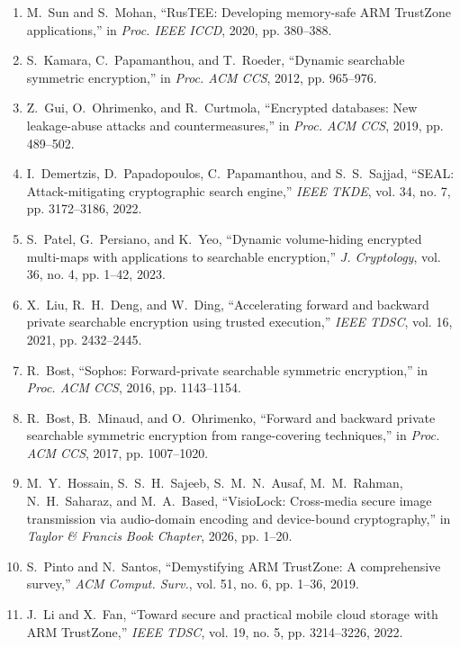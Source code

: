 \documentclass[preview,varwidth=88mm]{standalone}
\begin{document}
{\begin{enumerate}
\item[{[12]}] M.~Sun and S.~Mohan, ``RusTEE: Developing memory-safe ARM TrustZone applications,'' in \emph{Proc. IEEE ICCD}, 2020, pp. 380--388.
\item[{[13]}] S.~Kamara, C.~Papamanthou, and T.~Roeder, ``Dynamic searchable symmetric encryption,'' in \emph{Proc. ACM CCS}, 2012, pp. 965--976.
\item[{[14]}] Z.~Gui, O.~Ohrimenko, and R.~Curtmola, ``Encrypted databases: New leakage-abuse attacks and countermeasures,'' in \emph{Proc. ACM CCS}, 2019, pp. 489--502.
\item[{[15]}] I.~Demertzis, D.~Papadopoulos, C.~Papamanthou, and S.~S.~Sajjad, ``SEAL: Attack-mitigating cryptographic search engine,'' \emph{IEEE TKDE}, vol. 34, no. 7, pp. 3172--3186, 2022.
\item[{[16]}] S.~Patel, G.~Persiano, and K.~Yeo, ``Dynamic volume-hiding encrypted multi-maps with applications to searchable encryption,'' \emph{J. Cryptology}, vol. 36, no. 4, pp. 1--42, 2023.
\item[{[17]}] X.~Liu, R.~H.~Deng, and W.~Ding, ``Accelerating forward and backward private searchable encryption using trusted execution,'' \emph{IEEE TDSC}, vol. 16, 2021, pp. 2432--2445.
\item[{[18]}] R.~Bost, ``Sophos: Forward-private searchable symmetric encryption,'' in \emph{Proc. ACM CCS}, 2016, pp. 1143--1154.
\item[{[19]}] R.~Bost, B.~Minaud, and O.~Ohrimenko, ``Forward and backward private searchable symmetric encryption from range-covering techniques,'' in \emph{Proc. ACM CCS}, 2017, pp. 1007--1020.
\item[{[20]}] M.~Y.~Hossain, S.~S.~H.~Sajeeb, S.~M.~N.~Ausaf, M.~M.~Rahman, N.~H.~Saharaz, and M.~A.~Based, ``VisioLock: Cross-media secure image transmission via audio-domain encoding and device-bound cryptography,'' in \emph{Taylor \& Francis Book Chapter}, 2026, pp. 1--20.
\item[{[21]}] S.~Pinto and N.~Santos, ``Demystifying ARM TrustZone: A comprehensive survey,'' \emph{ACM Comput. Surv.}, vol. 51, no. 6, pp. 1--36, 2019.
\item[{[22]}] J.~Li and X.~Fan, ``Toward secure and practical mobile cloud storage with ARM TrustZone,'' \emph{IEEE TDSC}, vol. 19, no. 5, pp. 3214--3226, 2022.
\end{enumerate}
}
\end{document}
